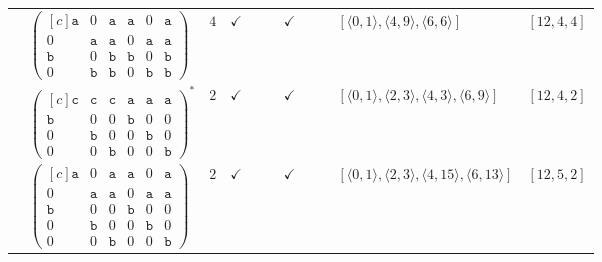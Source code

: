 \documentclass[12pt]{article}
\theoremstyle{definition}
\theoremstyle{plain}
\begin{document}
{\begin{longtable}{@{}cYcccccccZc@{}}
\cmidrule(lr){2-11}

& $\begin{pmatrix*}[c]
\mathtt{a}  &  0  &  \mathtt{a}  &  \mathtt{a}  &  0  &  \mathtt{a}  \\
0  &  \mathtt{a}  &  \mathtt{a}  &  0  &  \mathtt{a}  &  \mathtt{a}  \\
\mathtt{b}  &  0  &  \mathtt{b}  &  \mathtt{b}  &  0  &  \mathtt{b}    \\
0  &  \mathtt{b}  &  \mathtt{b}  &  0  &  \mathtt{b}  &  \mathtt{b}
\end{pmatrix*}$
& $4$
& $\checkmark$
&
&
& $\checkmark$
&
&
& $[\langle0,1\rangle,\allowbreak\langle4,9\rangle,\allowbreak\langle6,6\rangle]$
& $[12,4,4]$ \\

\cmidrule(lr){2-11}

& $\begin{pmatrix*}[c]
\mathtt{c}  &  \mathtt{c}  &  \mathtt{c}  &  \mathtt{a}  &  \mathtt{a}  &  \mathtt{a}  \\
\mathtt{b}  &  0  &  0  &  \mathtt{b}  &  0  &  0  \\
0  &  \mathtt{b}  &  0  &  0  &  \mathtt{b}  &  0  \\
0  &  0  &  \mathtt{b}  &  0  &  0  &  \mathtt{b}
\end{pmatrix*}^*$
& $2$
& $\checkmark$
&
&
& $\checkmark$
&
&
& $[\langle0,1\rangle,\allowbreak\langle2,3\rangle,\allowbreak\langle4,3\rangle,\allowbreak\langle6,9\rangle]$
& $[12,4,2]$     \\

\cmidrule(lr){2-11}

& $\begin{pmatrix*}[c]
\mathtt{a}  &  0  &  \mathtt{a}  &  \mathtt{a}  &  0  &  \mathtt{a}  \\
0  &  \mathtt{a}  &  \mathtt{a}  &  0  &  \mathtt{a}  &  \mathtt{a}  \\
\mathtt{b}  &  0  &  0  &  \mathtt{b}  &  0  &  0  \\
0  &  \mathtt{b}  &  0  &  0  &  \mathtt{b}  &  0  \\
0  &  0  &  \mathtt{b}  &  0  &  0  &  \mathtt{b}
\end{pmatrix*}$
& $2$
& $\checkmark$
&
&
& $\checkmark$
&
&
& $[\langle0,1\rangle,\allowbreak\langle2,3\rangle,\allowbreak\langle4,15\rangle,\allowbreak\langle6,13\rangle]$
& $[12,5,2]$     \\

\cmidrule(lr){2-11}



\end{longtable}}
\end{document}
